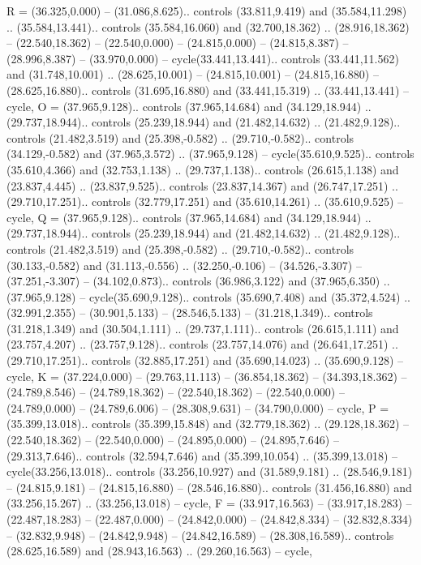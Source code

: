 {R} = {(36.325,0.000) -- (31.086,8.625).. controls (33.811,9.419) and (35.584,11.298) .. (35.584,13.441).. controls (35.584,16.060) and (32.700,18.362) .. (28.916,18.362) -- (22.540,18.362) -- (22.540,0.000) -- (24.815,0.000) -- (24.815,8.387) -- (28.996,8.387) -- (33.970,0.000) -- cycle(33.441,13.441).. controls (33.441,11.562) and (31.748,10.001) .. (28.625,10.001) -- (24.815,10.001) -- (24.815,16.880) -- (28.625,16.880).. controls (31.695,16.880) and (33.441,15.319) .. (33.441,13.441) -- cycle},
{O} = {(37.965,9.128).. controls (37.965,14.684) and (34.129,18.944) .. (29.737,18.944).. controls (25.239,18.944) and (21.482,14.632) .. (21.482,9.128).. controls (21.482,3.519) and (25.398,-0.582) .. (29.710,-0.582).. controls (34.129,-0.582) and (37.965,3.572) .. (37.965,9.128) -- cycle(35.610,9.525).. controls (35.610,4.366) and (32.753,1.138) .. (29.737,1.138).. controls (26.615,1.138) and (23.837,4.445) .. (23.837,9.525).. controls (23.837,14.367) and (26.747,17.251) .. (29.710,17.251).. controls (32.779,17.251) and (35.610,14.261) .. (35.610,9.525) -- cycle},
{Q} = {(37.965,9.128).. controls (37.965,14.684) and (34.129,18.944) .. (29.737,18.944).. controls (25.239,18.944) and (21.482,14.632) .. (21.482,9.128).. controls (21.482,3.519) and (25.398,-0.582) .. (29.710,-0.582).. controls (30.133,-0.582) and (31.113,-0.556) .. (32.250,-0.106) -- (34.526,-3.307) -- (37.251,-3.307) -- (34.102,0.873).. controls (36.986,3.122) and (37.965,6.350) .. (37.965,9.128) -- cycle(35.690,9.128).. controls (35.690,7.408) and (35.372,4.524) .. (32.991,2.355) -- (30.901,5.133) -- (28.546,5.133) -- (31.218,1.349).. controls (31.218,1.349) and (30.504,1.111) .. (29.737,1.111).. controls (26.615,1.111) and (23.757,4.207) .. (23.757,9.128).. controls (23.757,14.076) and (26.641,17.251) .. (29.710,17.251).. controls (32.885,17.251) and (35.690,14.023) .. (35.690,9.128) -- cycle},
{K} = {(37.224,0.000) -- (29.763,11.113) -- (36.854,18.362) -- (34.393,18.362) -- (24.789,8.546) -- (24.789,18.362) -- (22.540,18.362) -- (22.540,0.000) -- (24.789,0.000) -- (24.789,6.006) -- (28.308,9.631) -- (34.790,0.000) -- cycle},
{P} = {(35.399,13.018).. controls (35.399,15.848) and (32.779,18.362) .. (29.128,18.362) -- (22.540,18.362) -- (22.540,0.000) -- (24.895,0.000) -- (24.895,7.646) -- (29.313,7.646).. controls (32.594,7.646) and (35.399,10.054) .. (35.399,13.018) -- cycle(33.256,13.018).. controls (33.256,10.927) and (31.589,9.181) .. (28.546,9.181) -- (24.815,9.181) -- (24.815,16.880) -- (28.546,16.880).. controls (31.456,16.880) and (33.256,15.267) .. (33.256,13.018) -- cycle},
{F} = {(33.917,16.563) -- (33.917,18.283) -- (22.487,18.283) -- (22.487,0.000) -- (24.842,0.000) -- (24.842,8.334) -- (32.832,8.334) -- (32.832,9.948) -- (24.842,9.948) -- (24.842,16.589) -- (28.308,16.589).. controls (28.625,16.589) and (28.943,16.563) .. (29.260,16.563) -- cycle},
